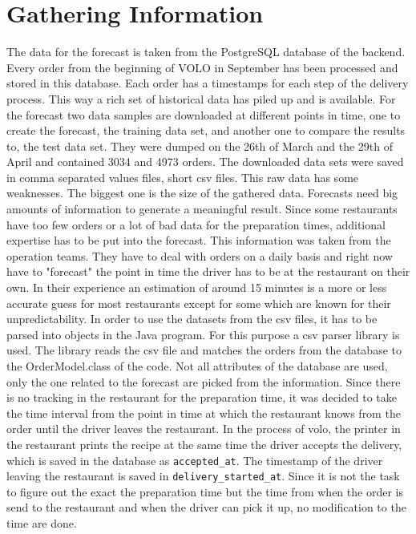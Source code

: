 \section{Gathering Information}\label{section:Gathering Information}
The data for the forecast is taken from the PostgreSQL database of the backend. Every order from the beginning of VOLO in September has been processed and stored in this database. Each order has a timestamps for each step of the delivery process. This way a rich set of historical data has piled up and is available. For the forecast two data samples are downloaded at different points in time, one to create the forecast, the training data set, and another one to compare the results to, the test data set. They were dumped on the 26th of March and the 29th of April and contained 3034 and 4973 orders. The downloaded data sets were saved in comma separated values files, short csv files.\newline
This raw data has some weaknesses. The biggest one is the size of the gathered data. Forecasts need big amounts of information to generate a meaningful result. Since some restaurants have too few orders or a lot of bad data for the preparation times, additional expertise has to be put into the forecast. This information was taken from the operation teams. They have to deal with orders on a daily basis and right now have to "forecast" the point in time the driver has to be at the restaurant on their own. In their experience an estimation of around 15 minutes is a more or less accurate guess for most restaurants except for some which are known for their unpredictability.\newline
In order to use the datasets from the csv files, it has to be parsed into objects in the Java program. For this purpose a csv parser library is used. The library reads the csv file and matches the orders from the database to the OrderModel.class of the code. Not all attributes of the database are used, only the one related to the forecast are picked from the information. Since there is no tracking in the restaurant for the preparation time, it was decided to take the time interval from the point in time at which the restaurant knows from the order until the driver leaves the restaurant. In the process of volo, the printer in the restaurant prints the recipe at the same time the driver accepts the delivery, which is saved in the database as \texttt{accepted\_at}. The timestamp of the driver leaving the restaurant is saved in \texttt{delivery\_started\_at}. Since it is not the task to figure out the exact the preparation time but the time from when the order is send to the restaurant and when the driver can pick it up, no modification to the time are done.
